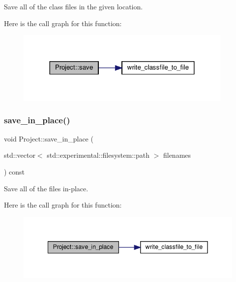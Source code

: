 Save all of the class files in the given location. 

Here is the call graph for this function\+:
\nopagebreak
\begin{figure}[H]
\begin{center}
\leavevmode
\includegraphics[width=300pt]{classProject_aff5e62e0e0e3e8c7123a7dd6ae51cb3f_cgraph}
\end{center}
\end{figure}
\mbox{\label{classProject_aecff214fd8b3fc5e855ec925ebe93f59}} 
\subsubsection{\texorpdfstring{save\+\_\+in\+\_\+place()}{save\_in\_place()}}
{\footnotesize\ttfamily void Project\+::save\+\_\+in\+\_\+place (\begin{DoxyParamCaption}\item[{std\+::vector$<$ std\+::experimental\+::filesystem\+::path $>$}]{filenames }\end{DoxyParamCaption}) const}



Save all of the files in-\/place. 

Here is the call graph for this function\+:
\nopagebreak
\begin{figure}[H]
\begin{center}
\leavevmode
\includegraphics[width=342pt]{classProject_aecff214fd8b3fc5e855ec925ebe93f59_cgraph}
\end{center}
\end{figure}
\mbox{\label{classProject_afee58125bfee1c7a1871be7805e855fa}} 
